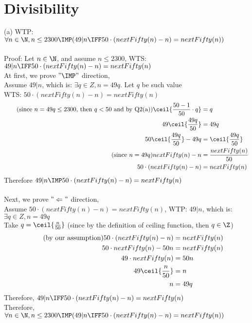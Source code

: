 \documentclass[12pt]{article}
\begin{document}
\section{Divisibility}
(a) WTP: $\forall n \in \N, n \le 2300 \IMP (49|n \IFF 50 \cdot (nextFifty(n) - n) = nextFifty(n))$\\
\\
Proof: Let $n \in \N$, and assume $n \le 2300$, WTS: $49|n \IFF 50 \cdot (nextFifty(n) - n) = nextFifty(n)$\\
At first, we prove $"\IMP"$ direction,\\
Assume $49|n$, which is: $\exists q \in Z, n = 49q$. Let $q$ be such value\\
WTS: $50 \cdot (nextFifty(n) - n) = nextFifty(n)$
\begin{align*}
    \tag{since $n = 49q \le 2300$, then $q < 50$ and by Q2(a)}
    \ceil{\frac{50 - 1}{50} \cdot q} &= q\\
    49\ceil{\frac{49q}{50}} &= 49q\\
    50\ceil{\frac{49q}{50}} -49q &= \ceil{\frac{49q}{50}}\\
    \tag{since $n = 49q$}
    nextFifty(n) - n &= \frac{nextFifty(n)}{50}\\
    50 \cdot (nextFifty(n) - n) &= nextFifty(n)
\end{align*}
Therefore $49|n \IMP 50 \cdot (nextFifty(n) - n) = nextFifty(n)$\\
\\
Next, we prove $"\Leftarrow"$ direction,\\
Assume $50 \cdot (nextFifty(n) - n) = nextFifty(n)$, WTP: $49|n$, which is: $\exists q \in Z, n = 49q$\\
Take $q = \ceil{\frac{n}{50}}$ (since by the definition of ceiling function, then $q \in \Z$)
\begin{align*}
    \tag{by our assumption}
    50 \cdot (nextFifty(n) - n) &= nextFifty(n)\\
    50 \cdot nextFifty(n) - 50n &= nextFifty(n)\\
    49 \cdot nextFifty(n) &= 50n\\
    49\ceil{\frac{n}{50}} &= n\\
    n &= 49q
\end{align*}
Therefore, $49|n \IFF 50 \cdot (nextFifty(n) - n) = nextFifty(n)$\\
Therefore, $\forall n \in \N, n \le 2300 \IMP (49|n \IFF 50 \cdot (nextFifty(n) - n) = nextFifty(n))$\\
\\
\end{document}
